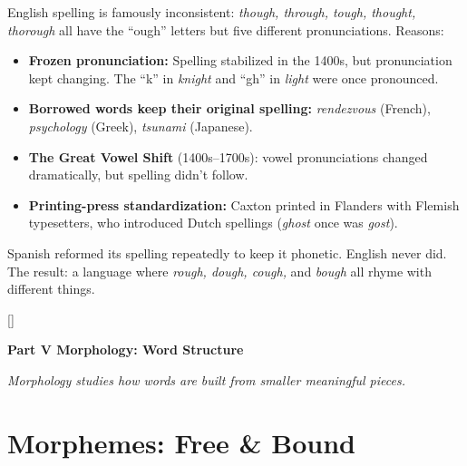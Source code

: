 \documentclass[11pt, letterpaper]{article}
\newcommand{\purplesections}{%
  \titleformat{\section}{\large\bfseries\color{sectionpurple}}{}{0em}{}[\color{sectionpurple}\titlerule]%
  \titleformat{\subsection}{\normalsize\bfseries\color{sectionpurple!80!black}}{}{0em}{}%
}
\newcommand{\partbanner}[3]{%
  \begin{tcolorbox}[colback=#1, colframe=#2, boxrule=1.2pt, arc=4pt,
    left=8pt, right=8pt, top=6pt, bottom=6pt]
    \begin{center}{\LARGE\bfseries #3}\end{center}
  \end{tcolorbox}%
}
\begin{document}
\begin{tcolorbox}[colback=part5bg, colframe=sectionteal,
  title={\bfseries Why is English spelling so weird?}, arc=3pt, boxrule=1pt]
English spelling is famously inconsistent: \emph{though, through, tough, thought, thorough} all have the ``ough'' letters but five different pronunciations. Reasons:
\begin{itemize}[noitemsep, leftmargin=*]
  \item \textbf{Frozen pronunciation:} Spelling stabilized in the 1400s, but pronunciation kept changing. The ``k'' in \emph{knight} and ``gh'' in \emph{light} were once pronounced.
  \item \textbf{Borrowed words keep their original spelling:} \emph{rendezvous} (French), \emph{psychology} (Greek), \emph{tsunami} (Japanese).
  \item \textbf{The Great Vowel Shift} (1400s--1700s): vowel pronunciations changed dramatically, but spelling didn't follow.
  \item \textbf{Printing-press standardization:} Caxton printed in Flanders with Flemish typesetters, who introduced Dutch spellings (\emph{ghost} once was \emph{gost}).
\end{itemize}
Spanish reformed its spelling repeatedly to keep it phonetic. English never did. The result: a language where \emph{rough, dough, cough,} and \emph{bough} all rhyme with different things.
\end{tcolorbox}

\newpage

\purplesections
{}
\partbanner{part3bg}{sectionpurple}{Part V \quad Morphology: Word Structure}

\vspace{8pt}
\begin{center}\small\itshape
  Morphology studies how words are built from smaller meaningful pieces.
\end{center}

\section*{Morphemes: Free \& Bound}
\end{document}
